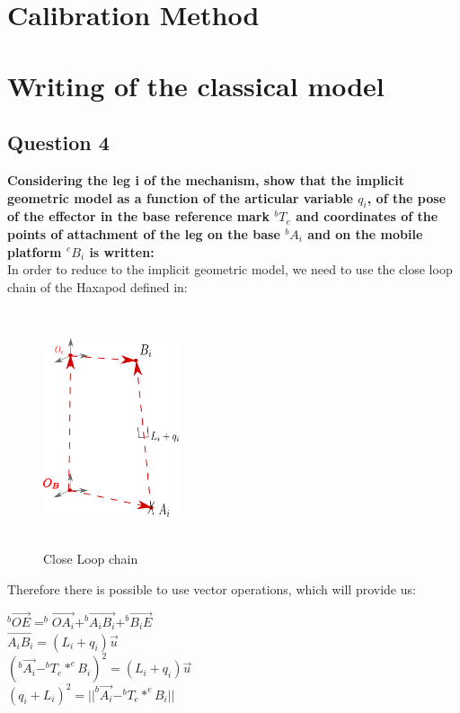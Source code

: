 \documentclass[12pt, twoside]{report}
\begin{document}
\section{Calibration Method}

\section{Writing of the classical model}
\subsection{Question 4}
\textbf{Considering the leg i of the mechanism, show that the implicit geometric model as a
function of the articular variable $q_i$, of the pose of the effector in the base reference mark $^b T_e$ and
coordinates of the points of attachment of the leg on the base $^b A_i$ and on the mobile platform $^e B_i$ is
written:}\\


In order to reduce to the implicit geometric model, we need to use the close loop chain of the Haxapod defined in:\\
\begin{figure}[H]
    \centering
    \includegraphics[height=7cm, width=4cm]{TP_2/close_loop.png}
    \caption{Close Loop chain}
    \label{fig:close_loop}
\end{figure}
Therefore there is possible to use vector operations, which will provide us:\\
\begin{center}
    $^b \Vec{OE} = ^b \Vec{OA_{i}} + ^b\Vec{A_i B_i} + ^b \Vec{B_i E} $\\
    $\Vec{A_i B_i} = (L_i + q_i)\Vec{u}$\\
    $( ^b \Vec{A_i} - ^b T_{e}* ^e B_{i} )^2 = (L_{i}+ q_{i}) \Vec{u} $\\
    $(q_{i} + L_{i})^2 = ||^b \Vec{A_i} - ^b T_e * ^e B_i||$
    
\end{center}
\end{document}
